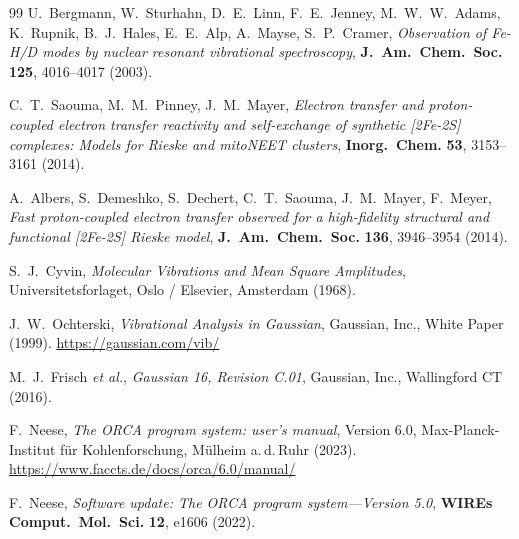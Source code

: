 \documentclass[11pt,a4paper,twoside]{article}
\theoremstyle{remark}
\begin{document}
\begin{thebibliography}{99}
U.~Bergmann, W.~Sturhahn, D.~E.~Linn, F.~E.~Jenney, M.~W.~W.~Adams,
K.~Rupnik, B.~J.~Hales, E.~E.~Alp, A.~Mayse, S.~P.~Cramer,
\emph{Observation of {Fe-H/D} modes by nuclear resonant vibrational
spectroscopy},
\textbf{J.\ Am.\ Chem.\ Soc.} \textbf{125}, 4016--4017 (2003).

C.~T.~Saouma, M.~M.~Pinney, J.~M.~Mayer,
\emph{Electron transfer and proton-coupled electron transfer reactivity
and self-exchange of synthetic {[}2Fe-2S{]} complexes:
Models for Rieske and mitoNEET clusters},
\textbf{Inorg.\ Chem.} \textbf{53}, 3153--3161 (2014).

A.~Albers, S.~Demeshko, S.~Dechert, C.~T.~Saouma, J.~M.~Mayer, F.~Meyer,
\emph{Fast proton-coupled electron transfer observed for a high-fidelity
structural and functional {[}2Fe-2S{]} {Rieske} model},
\textbf{J.\ Am.\ Chem.\ Soc.} \textbf{136}, 3946--3954 (2014).


S.~J.~Cyvin,
\emph{Molecular Vibrations and Mean Square Amplitudes},
Universitetsforlaget, Oslo / Elsevier, Amsterdam (1968).

J.~W.~Ochterski,
\emph{Vibrational Analysis in Gaussian},
Gaussian, Inc., White Paper (1999).
\url{https://gaussian.com/vib/}

M.~J.~Frisch \emph{et al.},
\emph{Gaussian 16, Revision C.01},
Gaussian, Inc., Wallingford CT (2016).

F.~Neese,
\emph{The ORCA program system: user's manual},
Version 6.0, Max-Planck-Institut f\"ur Kohlenforschung,
M\"ulheim a.\,d.\,Ruhr (2023).
\url{https://www.faccts.de/docs/orca/6.0/manual/}

F.~Neese,
\emph{Software update: The ORCA program system---Version 5.0},
\textbf{WIREs Comput.\ Mol.\ Sci.} \textbf{12}, e1606 (2022).

\end{thebibliography}
\end{document}
